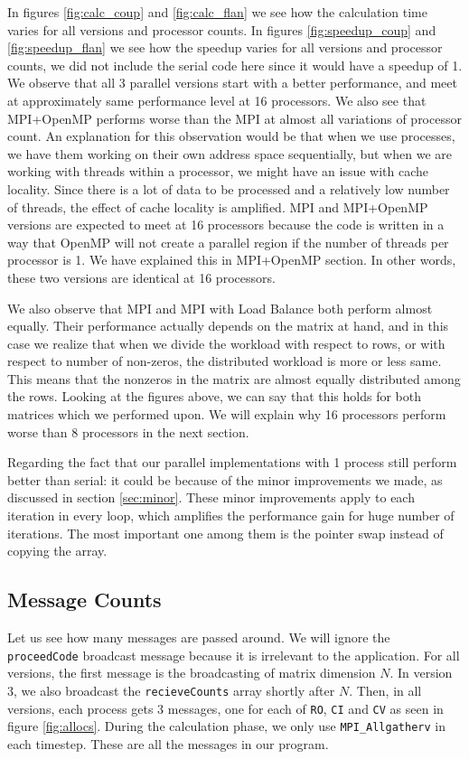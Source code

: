 \documentclass[12pt,reqno]{amsart}
\newcommand{\code}[1]{\texttt{#1}}
\begin{document}
In figures \ref{fig:calc_coup} and \ref{fig:calc_flan} we see how the calculation time varies for all versions and processor counts. In figures \ref{fig:speedup_coup} and \ref{fig:speedup_flan} we see how the speedup varies for all versions and processor counts, we did not include the serial code here since it would have a speedup of 1. We observe that all 3 parallel versions start with a better performance, and meet at approximately same performance level at 16 processors. We also see that MPI+OpenMP performs worse than the MPI at almost all variations of processor count. An explanation for this observation would be that when we use processes, we have them working on their own address space sequentially, but when we are working with threads within a processor, we might have an issue with cache locality. Since there is a lot of data to be processed and a relatively low number of threads, the effect of cache locality is amplified. MPI and MPI+OpenMP versions are expected to meet at 16 processors because the code is written in a way that OpenMP will not create a parallel region if the number of threads per processor is 1. We have explained this in MPI+OpenMP section. In other words, these two versions are identical at 16 processors. 

We also observe that MPI and MPI with Load Balance both perform almost equally. Their performance actually depends on the matrix at hand, and in this case we realize that when we divide the workload with respect to rows, or with respect to number of non-zeros, the distributed workload is more or less same. This means that the nonzeros in the matrix are almost equally distributed among the rows. Looking at the figures above, we can say that this holds for both matrices which we performed upon. We will explain why 16 processors perform worse than 8 processors in the next section. 

Regarding the fact that our parallel implementations with 1 process still perform better than serial: it could be because of the minor improvements we made, as discussed in section \ref{sec:minor}. These minor improvements apply to each iteration in every loop, which amplifies the performance gain for huge number of iterations. The most important one among them is the pointer swap instead of copying the array.

\subsection{Message Counts}
Let us see how many messages are passed around. We will ignore the \code{proceedCode} broadcast message because it is irrelevant to the application. For all versions, the first message is the broadcasting of matrix dimension $N$. In version 3, we also broadcast the \code{recieveCounts} array shortly after $N$. Then, in all versions, each process gets 3 messages, one for each of \code{RO}, \code{CI} and \code{CV} as seen in figure \ref{fig:allocs}. During the calculation phase, we only use \code{MPI\_Allgatherv} in each timestep. These are all the messages in our program.
\end{document}
